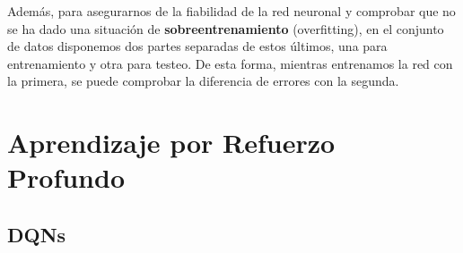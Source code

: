 Además, para asegurarnos de la fiabilidad de la red neuronal y comprobar que no se ha dado una situación de \textbf{sobreentrenamiento} (overfitting), en el conjunto de datos disponemos dos partes separadas de estos últimos, una para entrenamiento y otra para testeo. De esta forma, mientras entrenamos la red con la primera, se puede comprobar la diferencia de errores con la segunda. 

\section{Aprendizaje por Refuerzo Profundo}

\subsection{DQNs}
